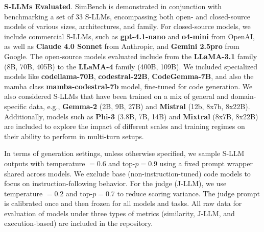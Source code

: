 \textbf{S-LLMs Evaluated}. SimBench is demonstrated in conjunction with benchmarking a set of 33 S-LLMs,
encompassing both open- and closed-source models of various sizes, architectures, and family.
For closed-source models, we include commercial S-LLMs, such as \textbf{gpt-4.1-nano} and \textbf{o4-mini}
from OpenAI, as well as \textbf{Claude 4.0 Sonnet} from Anthropic, and \textbf{Gemini 2.5pro} from Google.
The open-source models evaluated include from the \textbf{LLaMA-3.1} family (8B, 70B, 405B) to the \textbf{LLaMA-4} family (400B, 109B).
We included specialized models like \textbf{codellama-70B}, \textbf{codestral-22B}, \textbf{CodeGemma-7B}, and also the mamba class \textbf{mamba-codestral-7b} model,
fine-tuned for code generation. We also considered S-LLMs that have been trained on a mix of general and 
domain-specific data, e.g., \textbf{Gemma-2} (2B, 9B, 27B) and \textbf{Mistral} (12b, 8x7b, 8x22B). 
Additionally, models such as \textbf{Phi-3} (3.8B, 7B, 14B) and \textbf{Mixtral} (8x7B, 8x22B) 
are included to explore the impact of different scales and training regimes on their ability to perform in 
multi-turn setups. 

In terms of generation settings, unless otherwise specified, we sample S-LLM outputs with temperature $=0.6$ and top-$p=0.9$ using a fixed prompt wrapper shared across models. We exclude base (non-instruction-tuned) code models to focus on instruction-following behavior. For the judge (J-LLM), we use temperature $=0.2$ and top-$p=0.7$ to reduce scoring variance. The judge prompt is calibrated once and then frozen for all models and tasks. All raw data for evaluation of models under three types of metrics (similarity, J-LLM, and execution-based) are included in the repository.

